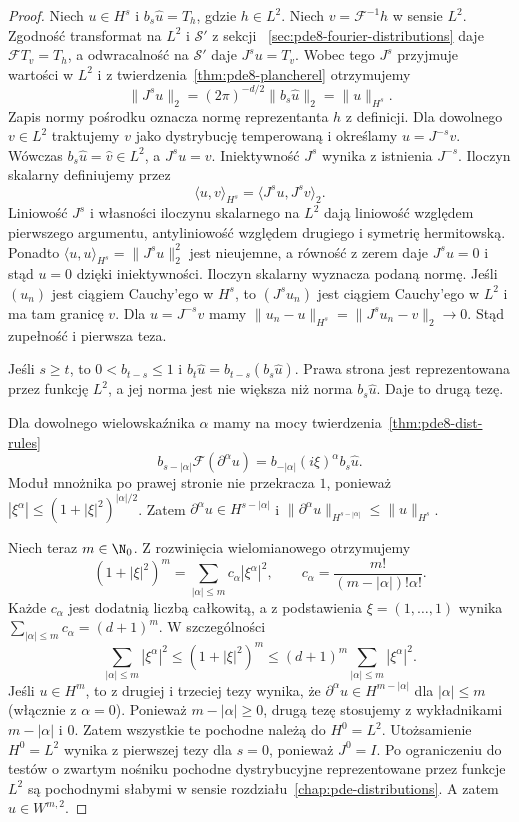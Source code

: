 \begin{proof}
Niech $u\in H^s$ i $b_s\widehat u=T_h$,
gdzie $h\in L^2$. Niech $v=\mathcal F^{-1}h$
w sensie $L^2$. Zgodność transformat na $L^2$
i $\mathcal S'$ z sekcji
~\ref{sec:pde8-fourier-distributions}
daje $\mathcal FT_v=T_h$, a odwracalność
na $\mathcal S'$ daje $J^su=T_v$.
Wobec tego $J^s$ przyjmuje wartości w $L^2$
i z twierdzenia~\ref{thm:pde8-plancherel}
otrzymujemy
\[
 \|J^s u\|_2=(2\pi)^{-d/2}\|b_s\widehat u\|_2
 =\|u\|_{H^s}.
\]
Zapis normy pośrodku oznacza normę reprezentanta
$h$ z definicji. Dla dowolnego $v\in L^2$
traktujemy $v$ jako dystrybucję temperowaną
i określamy $u=J^{-s}v$. Wówczas
$b_s\widehat u=\widehat v\in L^2$, a $J^su=v$.
Iniektywność $J^s$ wynika z istnienia $J^{-s}$.
Iloczyn skalarny definiujemy przez
\[
 \langle u,v\rangle_{H^s}
 =\langle J^s u,J^s v\rangle_2.
\]
Liniowość $J^s$ i własności iloczynu skalarnego
na $L^2$ dają liniowość względem pierwszego
argumentu, antyliniowość względem drugiego
i symetrię hermitowską.
Ponadto $\langle u,u\rangle_{H^s}=\|J^su\|_2^2$
jest nieujemne, a równość z zerem daje $J^su=0$
i stąd $u=0$ dzięki iniektywności.
Iloczyn skalarny wyznacza podaną normę.
Jeśli $(u_n)$ jest ciągiem Cauchy'ego w $H^s$,
to $(J^su_n)$ jest ciągiem Cauchy'ego w $L^2$
i ma tam granicę $v$. Dla $u=J^{-s}v$ mamy
$\|u_n-u\|_{H^s}=\|J^s u_n-v\|_2\to0$.
Stąd zupełność i pierwsza teza.

Jeśli $s\ge t$, to $0<b_{t-s}\le1$ i
$b_t\widehat u=b_{t-s}(b_s\widehat u)$.
Prawa strona jest reprezentowana przez funkcję
$L^2$, a jej norma jest nie większa niż norma
$b_s\widehat u$. Daje to drugą tezę.

Dla dowolnego wielowskaźnika $\alpha$ mamy
na mocy twierdzenia~\ref{thm:pde8-dist-rules}
\[
 b_{s-|\alpha|}\mathcal F(\partial^\alpha u)
 =b_{-|\alpha|}(i\xi)^\alpha b_s\widehat u.
\]
Moduł mnożnika po prawej stronie nie przekracza
$1$, ponieważ
$|\xi^\alpha|\le(1+|\xi|^2)^{|\alpha|/2}$.
Zatem $\partial^\alpha u\in H^{s-|\alpha|}$
i $\|\partial^\alpha u\|_{H^{s-|\alpha|}}
\le\|u\|_{H^s}$.

Niech teraz $m\in\N_0$. Z rozwinięcia
wielomianowego otrzymujemy
\[
 (1+|\xi|^2)^m
 =\sum_{|\alpha|\le m}c_\alpha|\xi^\alpha|^2,
 \qquad c_\alpha=\frac{m!}{(m-|\alpha|)!\alpha!}.
\]
Każde $c_\alpha$ jest dodatnią liczbą całkowitą,
a z podstawienia $\xi=(1,\ldots,1)$ wynika
$\sum_{|\alpha|\le m}c_\alpha=(d+1)^m$.
W szczególności
\[
 \sum_{|\alpha|\le m}|\xi^\alpha|^2
 \le (1+|\xi|^2)^m
 \le (d+1)^m\sum_{|\alpha|\le m}|\xi^\alpha|^2.
\]
Jeśli $u\in H^m$, to z drugiej i trzeciej tezy
wynika, że $\partial^\alpha u\in H^{m-|\alpha|}$
dla $|\alpha|\le m$ (włącznie z $\alpha=0$).
Ponieważ $m-|\alpha|\ge0$, drugą tezę
stosujemy z wykładnikami $m-|\alpha|$ i $0$.
Zatem wszystkie te pochodne należą do $H^0=L^2$.
Utożsamienie $H^0=L^2$ wynika z pierwszej tezy
dla $s=0$, ponieważ $J^0=I$.
Po ograniczeniu do testów o zwartym nośniku
pochodne dystrybucyjne reprezentowane przez
funkcje $L^2$ są pochodnymi słabymi w sensie
rozdziału~\ref{chap:pde-distributions}.
A zatem $u\in W^{m,2}$.


\end{proof}
